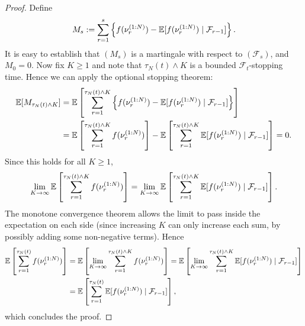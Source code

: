 \begin{proof}
Define 
\begin{equation*}
M_s 
:= \sum_{r=1}^s \left\{ f(\nu_r^{(1:N)}) 
        - \mathbb{E} [ f(\nu_r^{(1:N)}) \mid \mathcal{F}_{r-1} ] \right\} .
\end{equation*}
It is easy to establish that $(M_s)$ is a martingale with respect to $(\mathcal{F}_s)$, and $M_0 = 0$. 
Now fix $K\geq 1$ and note that $\tau_N(t) \wedge K$ is a bounded $\mathcal{F}_t$-stopping time.
Hence we can apply the optional stopping theorem:
\begin{align*}
\mathbb{E} [M_{\tau_N(t) \wedge K} ]
&= \mathbb{E} \left[ \sum_{r=1}^{\tau_N(t) \wedge K} \left\{ f(\nu_r^{(1:N)}) 
        - \mathbb{E} [ f(\nu_r^{(1:N)}) \mid \mathcal{F}_{r-1} ] \right\} \right] \\
&= \mathbb{E} \left[ \sum_{r=1}^{\tau_N(t) \wedge K} f(\nu_r^{(1:N)}) \right]
        - \mathbb{E} \left[ \sum_{r=1}^{\tau_N(t) \wedge K} 
        \mathbb{E} [ f(\nu_r^{(1:N)}) \mid \mathcal{F}_{r-1} ] \right]
=0 .
\end{align*}
Since this holds for all $K\geq 1$,
\begin{equation*}
\lim_{K\to\infty} \mathbb{E} \left[ \sum_{r=1}^{\tau_N(t) \wedge K} f(\nu_r^{(1:N)}) \right]
= \lim_{K\to\infty} \mathbb{E} \left[ \sum_{r=1}^{\tau_N(t) \wedge K} 
        \mathbb{E} [ f(\nu_r^{(1:N)}) \mid \mathcal{F}_{r-1} ] \right] .
\end{equation*}
The monotone convergence theorem allows the limit to pass inside the expectation on each side (since increasing $K$ can only increase each sum, by possibly adding some non-negative terms). Hence
\begin{align*}
\mathbb{E} \left[ \sum_{r=1}^{\tau_N(t)} f(\nu_r^{(1:N)}) \right]
&= \mathbb{E} \left[ \lim_{K\to\infty} \sum_{r=1}^{\tau_N(t) \wedge K} f(\nu_r^{(1:N)}) \right]
= \mathbb{E} \left[ \lim_{K\to\infty} \sum_{r=1}^{\tau_N(t) \wedge K} 
        \mathbb{E} [ f(\nu_r^{(1:N)}) \mid \mathcal{F}_{r-1} ] \right] \\
&= \mathbb{E} \left[ \sum_{r=1}^{\tau_N(t)} 
        \mathbb{E} [ f(\nu_r^{(1:N)}) \mid \mathcal{F}_{r-1} ] \right] ,
\end{align*}
which concludes the proof.
\end{proof}



